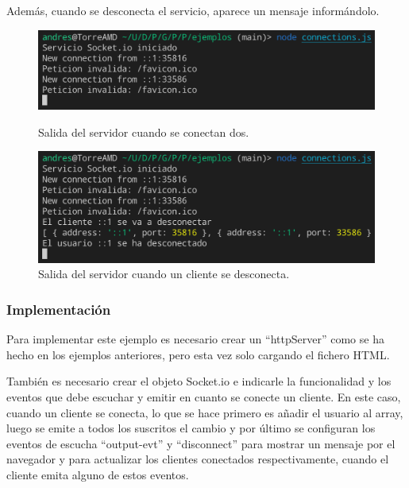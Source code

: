 \documentclass{article}
\begin{document}
Además, cuando se desconecta el servicio, aparece un mensaje informándolo.

\begin{figure}[H]
    \centering
    \begin{minipage}[H]{0.49\textwidth}
        \centering
        \includegraphics[width=\textwidth]{images/connectserver.png}
        \caption{Salida del servidor cuando se conectan dos.}
    \end{minipage}
    \hfill
    \begin{minipage}[H]{0.49\textwidth}
        \centering
        \includegraphics[width=\textwidth]{images/disconnectserver.png}
        \caption{Salida del servidor cuando un cliente se desconecta.}
    \end{minipage}
\end{figure}

\subsubsection{Implementación}
Para implementar este ejemplo es necesario crear un ``httpServer'' como se ha hecho en los ejemplos anteriores, pero esta vez solo cargando el fichero HTML.

También es necesario crear el objeto Socket.io e indicarle la funcionalidad y los eventos que debe escuchar y emitir en cuanto se conecte un cliente. En este caso, cuando un cliente se conecta, lo que se hace primero es añadir el usuario al array, luego se emite a todos los suscritos el cambio y por último se configuran los eventos de escucha ``output-evt'' y ``disconnect'' para mostrar un mensaje por el navegador y para actualizar los clientes conectados respectivamente, cuando el cliente emita alguno de estos eventos.
\end{document}
